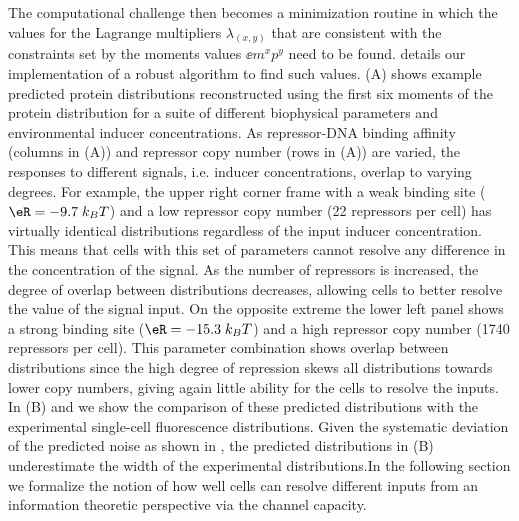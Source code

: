 The computational challenge then becomes a minimization routine in which the
values for the Lagrange multipliers $\lambda_{(x,y)}$ that are consistent with
the constraints set by the moments values $\ee{m^x p^y}$ need to be found.
 details our implementation of a robust algorithm to find
such values. (A) shows example predicted protein
distributions reconstructed using the first six moments of the protein
distribution for a suite of different biophysical parameters and environmental
inducer concentrations. As repressor-DNA binding affinity (columns in
(A)) and repressor copy number (rows in
(A)) are varied, the responses to different signals, i.e.
inducer concentrations, overlap to varying degrees. For example, the upper
right corner frame with a weak binding site ($\eR = -9.7 \; k_BT$) and a low
repressor copy number (22 repressors per cell) has virtually identical
distributions regardless of the input inducer concentration. This means that
cells with this set of parameters cannot resolve any difference in the
concentration of the signal. As the number of repressors is increased, the
degree of overlap between distributions decreases, allowing cells to better
resolve the value of the signal input. On the opposite extreme the lower left
panel shows a strong binding site ($\eR = -15.3 \; k_BT$) and a high repressor
copy number (1740 repressors per cell). This parameter combination shows
overlap between distributions since the high degree of repression skews all
distributions towards lower copy numbers, giving again little ability for the
cells to resolve the inputs. In (B) and 
we show the comparison of these predicted distributions with the experimental
single-cell fluorescence distributions. Given the systematic deviation of the
predicted noise as shown in , the predicted distributions
in (B) underestimate the width of the experimental
distributions.In the following section we formalize the notion of how well
cells can resolve different inputs from an information theoretic perspective
via the channel capacity.

